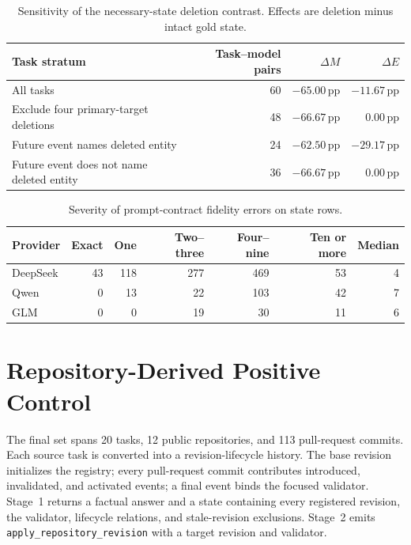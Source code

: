\documentclass[11pt]{article}
\newcommand{\Maction}{M}
\newcommand{\Eoutcome}{E}
\newcommand{\pp}{\,\mathrm{pp}}
\begin{document}
\begin{table}[h]
\centering
\caption{Sensitivity of the necessary-state deletion contrast. Effects are deletion minus intact gold state.}
\label{tab:deletion_sensitivity}
\small
\begin{tabular}{@{}lrrr@{}}
\toprule
Task stratum & Task--model pairs & \(\Delta\Maction\) & \(\Delta\Eoutcome\) \\
\midrule
All tasks & 60 & \(-65.00\pp\) & \(-11.67\pp\) \\
Exclude four primary-target deletions & 48 & \(-66.67\pp\) & \(0.00\pp\) \\
Future event names deleted entity & 24 & \(-62.50\pp\) & \(-29.17\pp\) \\
Future event does not name deleted entity & 36 & \(-66.67\pp\) & \(0.00\pp\) \\
\bottomrule
\end{tabular}
\end{table}

\begin{table}[h]
\centering
\caption{Severity of prompt-contract fidelity errors on state rows.}
\label{tab:severity}
\small
\begin{tabular}{@{}lrrrrrr@{}}
\toprule
Provider & Exact & One & Two--three & Four--nine & Ten or more & Median \\
\midrule
DeepSeek & 43 & 118 & 277 & 469 & 53 & 4 \\
Qwen & 0 & 13 & 22 & 103 & 42 & 7 \\
GLM & 0 & 0 & 19 & 30 & 11 & 6 \\
\bottomrule
\end{tabular}
\end{table}

\section{Repository-Derived Positive Control}
\label{app:repository}

The final set spans 20 tasks, 12 public repositories, and 113 pull-request commits. Each source task is converted into a revision-lifecycle history. The base revision initializes the registry; every pull-request commit contributes introduced, invalidated, and activated events; a final event binds the focused validator. Stage~1 returns a factual answer and a state containing every registered revision, the validator, lifecycle relations, and stale-revision exclusions. Stage~2 emits \texttt{apply\_repository\_revision} with a target revision and validator.
\end{document}
